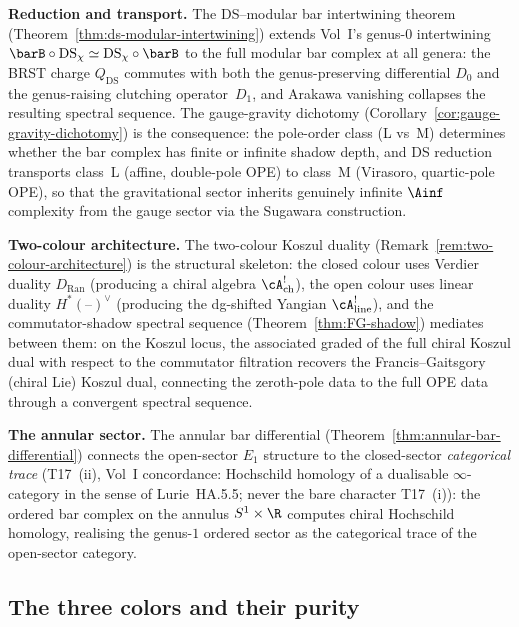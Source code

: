 \medskip\noindent
\textbf{Reduction and transport.}\enspace
The DS--modular bar intertwining theorem
(Theorem~\ref{thm:ds-modular-intertwining}) extends Vol~I's
genus-$0$ intertwining $\barB \circ \mathrm{DS}_\chi
\simeq \mathrm{DS}_\chi \circ \barB$ to the full modular
bar complex at all genera: the BRST charge $Q_{\mathrm{DS}}$
commutes with both the genus-preserving differential $D_0$ and the
genus-raising clutching operator~$D_1$, and Arakawa vanishing
collapses the resulting spectral sequence.
The gauge-gravity dichotomy
(Corollary~\ref{cor:gauge-gravity-dichotomy}) is the consequence:
the pole-order class (L vs~M) determines whether
the bar complex has finite or infinite shadow depth, and
DS reduction transports class~L (affine, double-pole OPE)
to class~M (Virasoro, quartic-pole OPE), so that the
gravitational sector inherits genuinely infinite $\Ainf$
complexity from the gauge sector via the Sugawara construction.

\medskip\noindent
\textbf{Two-colour architecture.}\enspace
The two-colour Koszul duality
(Remark~\ref{rem:two-colour-architecture}) is the structural
skeleton: the closed colour uses Verdier duality $D_{\mathrm{Ran}}$
(producing a chiral algebra $\cA^!_{\mathrm{ch}}$), the
open colour uses linear duality $H^*(\text{--})^\vee$
(producing the dg-shifted Yangian $\cA^!_{\mathrm{line}}$), and
the commutator-shadow spectral sequence
(Theorem~\ref{thm:FG-shadow}) mediates between them: on the Koszul
locus, the associated graded of the full chiral Koszul dual with
respect to the commutator filtration recovers the
Francis--Gaitsgory (chiral Lie) Koszul dual, connecting the
zeroth-pole data to the full OPE data through a convergent spectral
sequence.

\medskip\noindent
\textbf{The annular sector.}\enspace
The annular bar differential
(Theorem~\ref{thm:annular-bar-differential}) connects the
open-sector $E_1$ structure to the closed-sector
\emph{categorical trace} (T17~(ii), Vol~I concordance:
Hochschild homology of a dualisable $\infty$-category in the sense
of Lurie~HA.5.5; never the bare character T17~(i)): the
ordered bar complex on the annulus $S^1 \times \R$ computes
chiral Hochschild homology, realising the genus-$1$ ordered sector
as the categorical trace of the open-sector category.


\subsection{The three colors and their purity}

